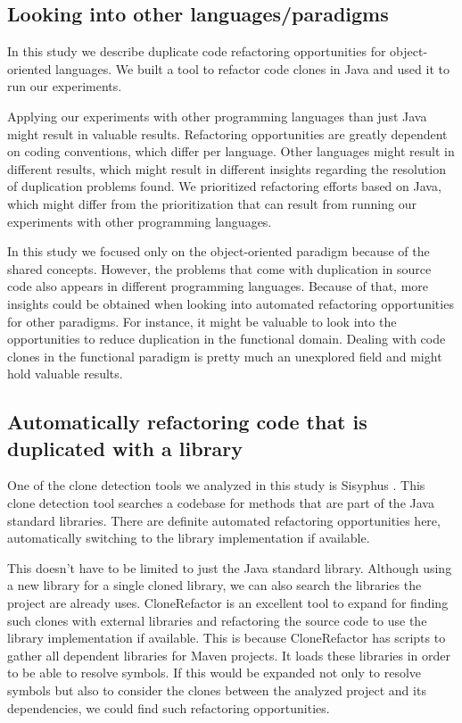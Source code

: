 \subsection{Looking into other languages/paradigms}
In this study we describe duplicate code refactoring opportunities for object-oriented languages. We built a tool to refactor code clones in Java and used it to run our experiments.

Applying our experiments with other programming languages than just Java might result in valuable results. Refactoring opportunities are greatly dependent on coding conventions, which differ per language. Other languages might result in different results, which might result in different insights regarding the resolution of duplication problems found. We prioritized refactoring efforts based on Java, which might differ from the prioritization that can result from running our experiments with other programming languages.

In this study we focused only on the object-oriented paradigm because of the shared concepts. However, the problems that come with duplication in source code also appears in different programming languages. Because of that, more insights could be obtained when looking into automated refactoring opportunities for other paradigms. For instance, it might be valuable to look into the opportunities to reduce duplication in the functional domain. Dealing with code clones in the functional paradigm is pretty much an unexplored field and might hold valuable results.

\subsection{Automatically refactoring code that is duplicated with a library}
One of the clone detection tools we analyzed in this study is Sisyphus \cite{eremondi2017sisyphus}. This clone detection tool searches a codebase for methods that are part of the Java standard libraries. There are definite automated refactoring opportunities here, automatically switching to the library implementation if available.

This doesn't have to be limited to just the Java standard library. Although using a new library for a single cloned library, we can also search the libraries the project are already uses. CloneRefactor is an excellent tool to expand for finding such clones with external libraries and refactoring the source code to use the library implementation if available. This is because CloneRefactor has scripts to gather all dependent libraries for Maven projects. It loads these libraries in order to be able to resolve symbols. If this would be expanded not only to resolve symbols but also to consider the clones between the analyzed project and its dependencies, we could find such refactoring opportunities.
